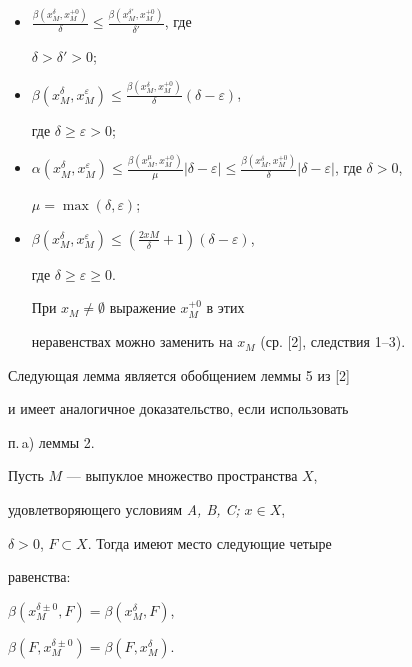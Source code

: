 \begin{itemize}


\item[a)] $\frac{\beta (x_{M}^{\delta },x_{M}^{+ 0})}{\delta } \leq


\frac{\beta (x_{M}^{\delta' },x_{M}^{+ 0})}{\delta' }$, где 


$\delta > \delta' > 0$;


\item[b)] $\beta (x_{M}^{\delta },x_{M}^{\varepsilon }) \leq


\frac{\beta (x_{M}^{\delta },x_{M}^{+ 0})}{\delta }(\delta - \varepsilon)$, 


где $\delta \geq \varepsilon > 0$;


\item[c)] $\alpha (x_{M}^{\delta },x_{M}^{\varepsilon }) \leq


\frac{\beta (x_{M}^{\mu },x_{M}^{+ 0}) }{\mu }|\delta - \varepsilon|


\leq \frac{\beta (x_{M}^{\delta },x_{M}^{+ 0}) }


{\delta }|\delta - \varepsilon|$, где $\delta > 0$, 


$\mu = \max (\delta,\varepsilon )$;


\item[d)] $\beta (x_{M}^{\delta },x_{M}^{\varepsilon }) \leq


(\frac{2xM}{\delta } + 1)(\delta - \varepsilon )$, 


где $\delta \geq \varepsilon \geq 0$.


При $x_{M} \neq \emptyset $ выражение $x_{M}^{+ 0}$ в этих


неравенствах можно заменить на $x_{M}$ (ср. [2], следствия 1--3).


\end{itemize}





Следующая лемма является обобщением леммы 5 из [2] 


и имеет аналогичное доказательство, если использовать


п.\,a) леммы 2.





\begin{lem}


Пусть $M$ --- выпуклое множество пространства $X$, 


удовлетворяющего условиям {\em A, B, C;} $x \in X$,


$\delta >0 $, $F \subset X$. Тогда имеют место следующие четыре


равенства$:$


$\beta (x_{M}^{\delta \pm 0},F) = \beta (x_{M}^{\delta },F)$,


$\beta (F,x_{M}^{\delta \pm 0}) = \beta (F,x_{M}^{\delta })$. 


\end{lem}






